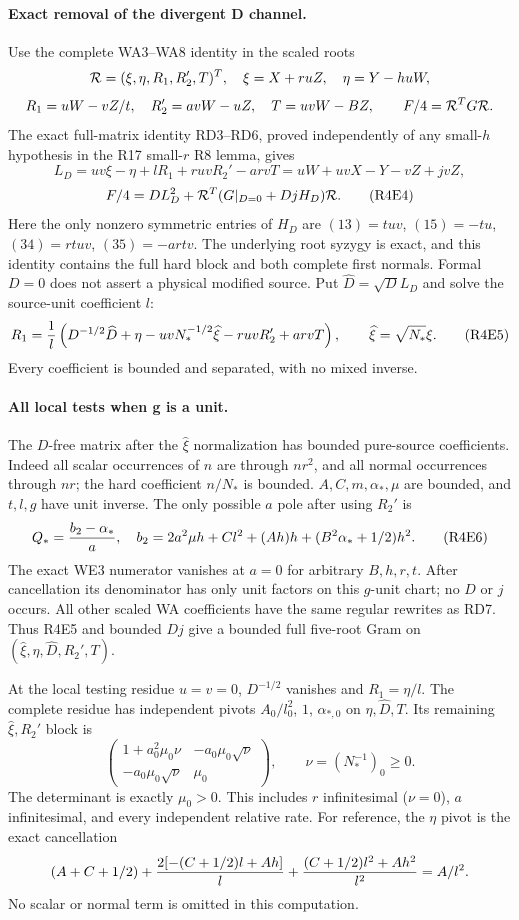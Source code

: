 \paragraph{Exact removal of the divergent D channel.}
Use the complete WA3--WA8 identity in the scaled roots
\[
 {\cal R}=(\xi,\eta,R_1,R_2',T)^T,
 \quad \xi=X+ruZ,\quad\eta=Y-huW,
\]
\[
 R_1=uW-vZ/t,\quad R_2'=avW-uZ,\quad T=uvW-BZ,
 \qquad F/4={\cal R}^TG{\cal R}.
\]
The exact full-matrix identity RD3--RD6, proved independently of any
small-$h$ hypothesis in the R17 small-$r$ R8 lemma, gives
\[
 L_D=uv\xi-\eta+lR_1+ruvR_2'-arvT
     =uW+uvX-Y-vZ+jvZ,
\]
\[
 F/4=D L_D^2+{\cal R}^T(G|_{D=0}+DjH_D){\cal R}.       \tag{R4E4}
\]
Here the only nonzero symmetric entries of $H_D$ are
$(13)=tuv$, $(15)=-tu$, $(34)=rtuv$, $(35)=-artv$.
The underlying root syzygy is exact, and this identity contains the
full hard block and both complete first normals. Formal $D=0$ does
not assert a physical modified source. Put $\widehat D=\sqrt D L_D$
and solve the source-unit coefficient $l$:
\[
 R_1={1\over l}\left(D^{-1/2}\widehat D+\eta
       -uvN_*^{-1/2}\widehat\xi-ruvR_2'+arvT\right),
 \qquad\widehat\xi=\sqrt{N_*}\xi.                  \tag{R4E5}
\]
Every coefficient is bounded and separated, with no mixed inverse.

\paragraph{All local tests when g is a unit.}
The $D$-free matrix after the $\widehat\xi$ normalization has bounded
pure-source coefficients. Indeed all scalar occurrences of $n$ are
through $nr^2$, and all normal occurrences through $nr$; the hard
coefficient $n/N_*$ is bounded. $A,C,m,\alpha_*,\mu$ are bounded,
and $t,l,g$ have unit inverse. The only possible $a$ pole after using
$R_2'$ is
\[
 Q_*={b_2-\alpha_*\over a},\quad
 b_2=2a^2\mu h+Cl^2+(Ah)h+(B^2\alpha_*+1/2)h^2.     \tag{R4E6}
\]
The exact WE3 numerator vanishes at $a=0$ for arbitrary $B,h,r,t$.
After cancellation its denominator has only unit factors on this
$g$-unit chart; no $D$ or $j$ occurs. All other scaled WA coefficients
have the same regular rewrites as RD7. Thus R4E5 and bounded $Dj$
give a bounded full five-root Gram on
$(\widehat\xi,\eta,\widehat D,R_2',T)$.

At the local testing residue $u=v=0$, $D^{-1/2}$ vanishes and
$R_1=\eta/l$. The complete residue has independent pivots
$A_0/l_0^2$, $1$, $\alpha_{*,0}$ on $\eta,\widehat D,T$.
Its remaining $\widehat\xi,R_2'$ block is
\[
 \begin{pmatrix}
 1+a_0^2\mu_0\nu&-a_0\mu_0\sqrt\nu\\
 -a_0\mu_0\sqrt\nu&\mu_0
 \end{pmatrix},\qquad
 \nu=(N_*^{-1})_0\ge0.                              \tag{R4E7}
\]
The determinant is exactly $\mu_0>0$. This includes $r$ infinitesimal
($\nu=0$), $a$ infinitesimal, and every independent relative rate.
For reference, the $\eta$ pivot is the exact cancellation
\[
 (A+C+1/2)+{2[-(C+1/2)l+Ah]\over l}
       +{(C+1/2)l^2+Ah^2\over l^2}=A/l^2.
\]
No scalar or normal term is omitted in this computation.

